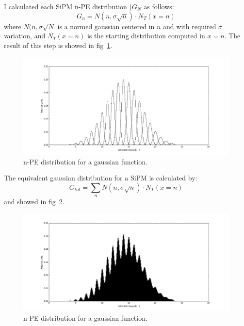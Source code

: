 \documentclass[10pt,a4paper, openany]{book}
\begin{document}
I calculated each SiPM n-PE distribution ($G_N$ as follows:
\begin{equation}
G_n = N(n,\sigma\sqrt{n}) \cdot N_T(x=n)
\end{equation}
where $N(n,\sigma\sqrt{N}$ is a normed gaussian centered in $n$ and with required $\sigma$ variation, and $N_T(x=n)$ is the starting distribution computed in $x=n$. The result of this step is showed in fig~\ref{fig:5}.\\
\begin{figure}[!h]
\begin{center}
\includegraphics[scale=0.3]{imm/gauss2.png}
\end{center}
\caption{n-PE distribution for a gaussian function.}
\label{fig:5}
\end{figure}
\newpage
The equivalent gaussian distribution for a SiPM is calculated by:
\begin{equation}
G_{tot} = \sum_n N(n,\sigma\sqrt{n}) \cdot N_T(x=n)
\end{equation}
and showed in fig~\ref{fig:6}.
\begin{figure}[!h]
\begin{center}
\includegraphics[scale=0.3]{imm/gauss3.png}
\end{center}
\caption{n-PE distribution for a gaussian function.}
\label{fig:6}
\end{figure}
\end{document}
